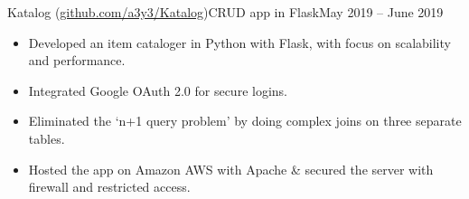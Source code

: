 \begin{cvsubsection}{Katalog \normalfont(\href{ https://github.com/a3y3/Katalog}{\normalfont github.com/a3y3/Katalog})}{CRUD app in Flask}{May 2019 -- June 2019}
	\begin{itemize}
		\item Developed an item cataloger in Python with Flask, with focus on scalability and performance.
		\item Integrated Google OAuth 2.0 for secure logins.
		\item Eliminated the ‘n+1 query problem’ by doing complex joins on three separate tables.
		\item Hosted the app on Amazon AWS with Apache \& secured the server with firewall and restricted access.
	\end{itemize}
\end{cvsubsection}
